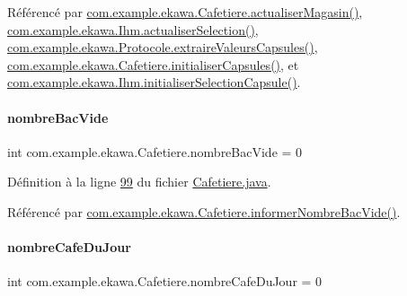 Référencé par \hyperlink{_cafetiere_8java_source_l00561}{com.\+example.\+ekawa.\+Cafetiere.\+actualiser\+Magasin()}, \hyperlink{_ihm_8java_source_l00892}{com.\+example.\+ekawa.\+Ihm.\+actualiser\+Selection()}, \hyperlink{_protocole_8java_source_l00319}{com.\+example.\+ekawa.\+Protocole.\+extraire\+Valeurs\+Capsules()}, \hyperlink{_cafetiere_8java_source_l00162}{com.\+example.\+ekawa.\+Cafetiere.\+initialiser\+Capsules()}, et \hyperlink{_ihm_8java_source_l00413}{com.\+example.\+ekawa.\+Ihm.\+initialiser\+Selection\+Capsule()}.

\mbox{\label{classcom_1_1example_1_1ekawa_1_1_cafetiere_a6491d6d04db5d6e7da868565b84f6d7f}} 
\paragraph{\texorpdfstring{nombre\+Bac\+Vide}{nombreBacVide}}
{\footnotesize\ttfamily int com.\+example.\+ekawa.\+Cafetiere.\+nombre\+Bac\+Vide = 0\hspace{0.3cm}{\ttfamily [private]}}



Définition à la ligne \hyperlink{_cafetiere_8java_source_l00099}{99} du fichier \hyperlink{_cafetiere_8java_source}{Cafetiere.\+java}.



Référencé par \hyperlink{_cafetiere_8java_source_l00358}{com.\+example.\+ekawa.\+Cafetiere.\+informer\+Nombre\+Bac\+Vide()}.

\mbox{\label{classcom_1_1example_1_1ekawa_1_1_cafetiere_a123b6fcb9a9c1decae40e026660e716b}} 
\paragraph{\texorpdfstring{nombre\+Cafe\+Du\+Jour}{nombreCafeDuJour}}
{\footnotesize\ttfamily int com.\+example.\+ekawa.\+Cafetiere.\+nombre\+Cafe\+Du\+Jour = 0\hspace{0.3cm}{\ttfamily [private]}}



